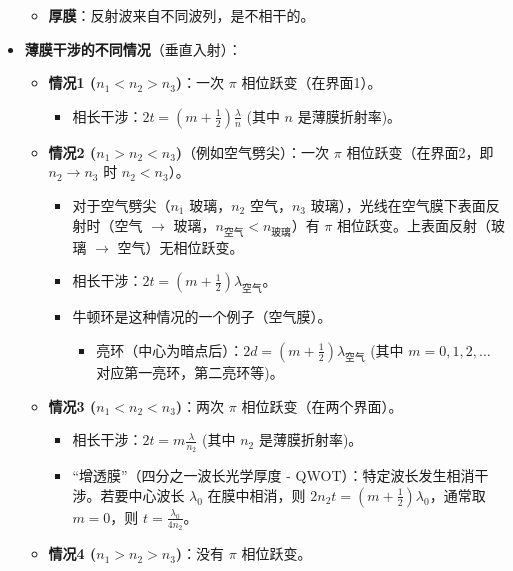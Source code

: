 \documentclass[UTF8]{ctexart}
\begin{document}
\begin{itemize}
\begin{itemize}
            \item \textbf{厚膜}：反射波来自不同波列，是不相干的。
        \end{itemize}
    \item \textbf{薄膜干涉的不同情况}（垂直入射）：
        \begin{itemize}
            \item \textbf{情况1 ($n_1 < n_2 > n_3$)}：一次 $\pi$ 相位跃变（在界面1）。
                \begin{itemize}
                    \item 相长干涉：$2t = (m + \frac{1}{2})\frac{\lambda}{n}$ (其中 $n$ 是薄膜折射率)。
                \end{itemize}
            \item \textbf{情况2 ($n_1 > n_2 < n_3$)}（例如空气劈尖）：一次 $\pi$ 相位跃变（在界面2，即 $n_2 \to n_3$ 时 $n_2 < n_3$）。
                 \begin{itemize}
                    \item 对于空气劈尖（$n_1$ 玻璃，$n_2$ 空气，$n_3$ 玻璃），光线在空气膜下表面反射时（空气 $\to$ 玻璃，$n_{空气} < n_{玻璃}$）有 $\pi$ 相位跃变。上表面反射（玻璃 $\to$ 空气）无相位跃变。
                    \item 相长干涉：$2t = (m + \frac{1}{2})\lambda_{空气}$。
                    \item 牛顿环是这种情况的一个例子（空气膜）。
                        \begin{itemize}
                            \item 亮环（中心为暗点后）：$2d = (m + \frac{1}{2})\lambda_{空气}$ (其中 $m=0, 1, 2, \dots$ 对应第一亮环，第二亮环等)。
                        \end{itemize}
                \end{itemize}
            \item \textbf{情况3 ($n_1 < n_2 < n_3$)}：两次 $\pi$ 相位跃变（在两个界面）。
                \begin{itemize}
                    \item 相长干涉：$2t = m\frac{\lambda}{n_2}$ (其中 $n_2$ 是薄膜折射率)。
                    \item “增透膜”（四分之一波长光学厚度 - QWOT）：特定波长发生相消干涉。若要中心波长 $\lambda_0$ 在膜中相消，则 $2n_2 t = (m+\frac{1}{2})\lambda_0$，通常取 $m=0$，则 $t = \frac{\lambda_0}{4n_2}$。
                \end{itemize}
            \item \textbf{情况4 ($n_1 > n_2 > n_3$)}：没有 $\pi$ 相位跃变。

\end{itemize}
\end{itemize}
\end{document}
